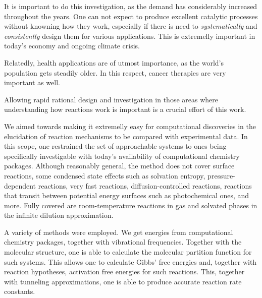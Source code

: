 It is important to do this investigation, as the demand has considerably increased throughout the years.
One can not expect to produce excellent catalytic processes without knowning how they work,
especially if there is need to \emph{systematically} and \emph{consistently} design them for various applications.
This is extremelly important in today's economy and ongoing climate crisis.

Relatedly, health applications are of utmost importance, as the world's population gets steadily older.
In this respect, cancer therapies are very important as well.

Allowing rapid rational design and investigation in those areas where understanding how reactions work is important
is a crucial effort of this work.

We aimed towards making it extremelly easy for computational discoveries in the elucidation of reaction mechanisms
to be compared with experimental data.
In this scope, one restrained the set of approachable systems to ones
being specifically investigable with today's availability of computational chemistry packages.
Although reasonably general, the method does not cover surface reactions,
some condensed state effects such as solvation entropy,
pressure-dependent reactions,
very fast reactions,
diffusion-controlled reactions,
reactions that transit between potential energy surfaces such as photochemical ones, and more.
Fully covered are room-temperature reactions in gas and solvated phases in the infinite dilution approximation.

A variety of methods were employed.
We get energies from computational chemistry packages,
together with vibrational frequencies.
Together with the molecular structure,
one is able to calculate the molecular partition function for such systems.
This allows one to calculate Gibbs' free energies and, together with reaction hypotheses,
activation free energies for such reactions.
This, together with tunneling approximations, one is able to produce accurate reaction rate constants.


